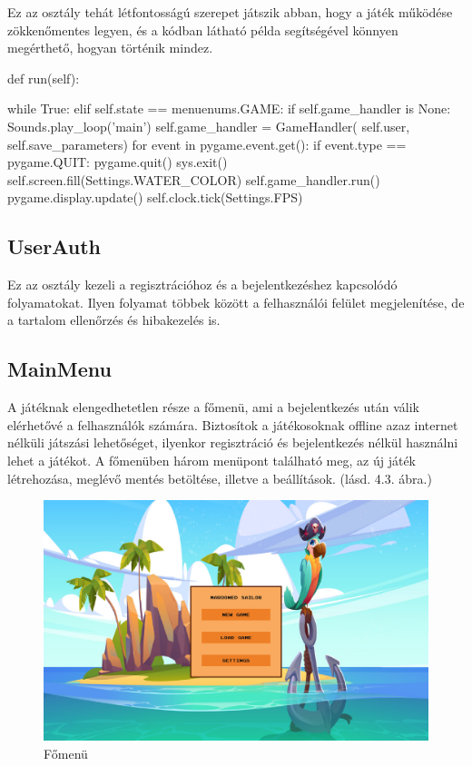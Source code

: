 Ez az osztály tehát létfontosságú szerepet játszik abban, hogy a játék működése zökkenőmentes legyen, és a kódban látható példa segítségével könnyen megérthető, hogyan történik mindez.


\begin{python}[caption={Játék főciklusa},label=py:főciklus]
    def run(self):

        while True:
            elif self.state == menuenums.GAME:
                if self.game_handler is None:
                    Sounds.play_loop('main')
                    self.game_handler = GameHandler(
                        self.user, self.save_parameters)
                for event in pygame.event.get():
                    if event.type == pygame.QUIT:
                        pygame.quit()
                        sys.exit()
                self.screen.fill(Settings.WATER_COLOR)
                self.game_handler.run()
                pygame.display.update()
                self.clock.tick(Settings.FPS)
\end{python}



\subsection{UserAuth}
Ez az osztály kezeli a regisztrációhoz és a bejelentkezéshez kapcsolódó folyamatokat. Ilyen folyamat többek között a felhasználói felület megjelenítése, de a tartalom ellenőrzés és hibakezelés is.

\subsection{MainMenu}

A játéknak elengedhetetlen része a főmenü, ami a bejelentkezés után válik elérhetővé a felhasználók számára. Biztosítok a játékosoknak offline azaz internet nélküli játszási lehetőséget, ilyenkor regisztráció és bejelentkezés nélkül használni lehet a játékot.
A főmenüben három menüpont található meg, az új játék létrehozása, meglévő mentés betöltése, illetve a beállítások. (lásd. 4.3. ábra.)   



\begin{figure}[H]
    \centering
    \includegraphics[width=15.0truecm]{images/mainmenu.png}
    \caption{Főmenü}
    \label{fig:Főmenü}
\end{figure}



